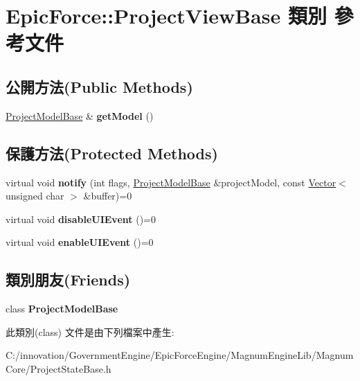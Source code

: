 \hypertarget{class_epic_force_1_1_project_view_base}{}\section{Epic\+Force\+:\+:Project\+View\+Base 類別 參考文件}
\label{class_epic_force_1_1_project_view_base}
\subsection*{公開方法(Public Methods)}
\begin{DoxyCompactItemize}
\item 
\hyperlink{class_epic_force_1_1_project_model_base}{Project\+Model\+Base} \& {\bfseries get\+Model} ()\hypertarget{class_epic_force_1_1_project_view_base_aee4bf623e8dc5d80025b4bda6ce934cd}{}\label{class_epic_force_1_1_project_view_base_aee4bf623e8dc5d80025b4bda6ce934cd}

\end{DoxyCompactItemize}
\subsection*{保護方法(Protected Methods)}
\begin{DoxyCompactItemize}
\item 
virtual void {\bfseries notify} (int flags, \hyperlink{class_epic_force_1_1_project_model_base}{Project\+Model\+Base} \&project\+Model, const \hyperlink{class_i_dream_sky_1_1_vector}{Vector}$<$ unsigned char $>$ \&buffer)=0\hypertarget{class_epic_force_1_1_project_view_base_aca209fb84f6eb568e0f7abc657de416d}{}\label{class_epic_force_1_1_project_view_base_aca209fb84f6eb568e0f7abc657de416d}

\item 
virtual void {\bfseries disable\+U\+I\+Event} ()=0\hypertarget{class_epic_force_1_1_project_view_base_ac9c36ecd388529ae01c76998dde005b8}{}\label{class_epic_force_1_1_project_view_base_ac9c36ecd388529ae01c76998dde005b8}

\item 
virtual void {\bfseries enable\+U\+I\+Event} ()=0\hypertarget{class_epic_force_1_1_project_view_base_ac3edbf1e19399f78399f6b7d95da9e24}{}\label{class_epic_force_1_1_project_view_base_ac3edbf1e19399f78399f6b7d95da9e24}

\end{DoxyCompactItemize}
\subsection*{類別朋友(Friends)}
\begin{DoxyCompactItemize}
\item 
class {\bfseries Project\+Model\+Base}\hypertarget{class_epic_force_1_1_project_view_base_a4adee89a75f9facb060d3c44ba6db2ed}{}\label{class_epic_force_1_1_project_view_base_a4adee89a75f9facb060d3c44ba6db2ed}

\end{DoxyCompactItemize}


此類別(class) 文件是由下列檔案中產生\+:\begin{DoxyCompactItemize}
\item 
C\+:/innovation/\+Government\+Engine/\+Epic\+Force\+Engine/\+Magnum\+Engine\+Lib/\+Magnum\+Core/Project\+State\+Base.\+h\end{DoxyCompactItemize}
